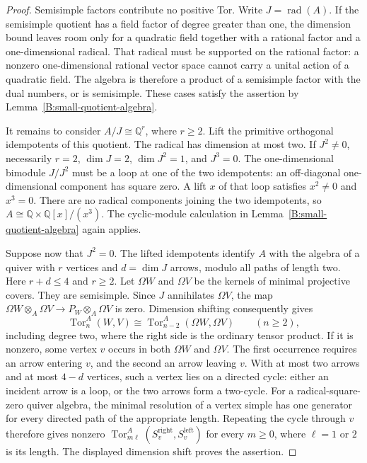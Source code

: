 \begin{proof}
Semisimple factors contribute no positive Tor.  Write $J=\operatorname{rad}(A)$.
If the semisimple quotient has a field factor of degree greater than
one, the dimension bound leaves room only for a quadratic field
together with a rational factor and a one-dimensional radical.
That radical must be supported on the rational factor: a nonzero
one-dimensional rational vector space cannot carry a unital action
of a quadratic field.  The algebra is therefore a product of a
semisimple factor with the dual numbers, or is semisimple.
These cases satisfy the assertion by
Lemma~\ref{B:small-quotient-algebra}.

It remains to consider $A/J\cong\mathbb Q^r$, where $r\geq2$.
Lift the primitive orthogonal idempotents of this quotient.  The
radical has dimension at most two.  If $J^2\ne0$, necessarily
$r=2$, $\dim J=2$, $\dim J^2=1$, and $J^3=0$.
The one-dimensional bimodule $J/J^2$ must be a loop at one of the
two idempotents: an off-diagonal one-dimensional component has
square zero.  A lift $x$ of that loop satisfies $x^2\ne0$ and
$x^3=0$.  There are no radical components joining the two
idempotents, so
$A\cong\mathbb Q\times\mathbb Q[x]/(x^3)$.
The cyclic-module calculation in
Lemma~\ref{B:small-quotient-algebra} again applies.

Suppose now that $J^2=0$.  The lifted idempotents identify $A$ with
the algebra of a quiver with $r$ vertices and $d=\dim J$ arrows,
modulo all paths of length two.  Here $r+d\leq4$ and $r\geq2$.
Let $\Omega W$ and $\Omega V$ be the kernels of minimal projective
covers.  They are semisimple.  Since $J$ annihilates $\Omega V$,
the map
$\Omega W\otimes_A\Omega V\to P_W\otimes_A\Omega V$
is zero.  Dimension shifting consequently gives
\[
 \operatorname{Tor}_n^A(W,V)
 \cong \operatorname{Tor}_{n-2}^A(\Omega W,\Omega V)
 \qquad(n\geq2),
\]
including degree two, where the right side is the ordinary tensor
product.  If it is nonzero, some vertex $v$ occurs in both
$\Omega W$ and $\Omega V$.  The first occurrence requires an
arrow entering $v$, and the second an arrow leaving $v$.
With at most two arrows and at most $4-d$ vertices, such a vertex
lies on a directed cycle: either an incident arrow is a loop, or
the two arrows form a two-cycle.
For a radical-square-zero quiver algebra, the minimal resolution
of a vertex simple has one generator for every directed path of
the appropriate length.  Repeating the cycle through $v$ therefore
gives nonzero
$\operatorname{Tor}_{m\ell}^A(S_v^{\mathrm{right}},S_v^{\mathrm{left}})$
for every $m\geq0$, where $\ell=1$ or $2$ is its length.
The displayed dimension shift proves the assertion.
\end{proof}

